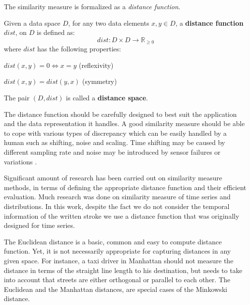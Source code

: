 \iftoggle{edit-mode}{\hspace{0pt}\marginpar{Distance function formal definition}}{}
The similarity measure is formalized as a \emph{distance function}. 
\begin{definition}
Given a data space $D$, for any two data elements $x,y \in D$, a \textbf{distance function} $dist$, on $D$ is defined as:
\begin{equation}
dist: D \times D \longrightarrow \mathbb R_{\geq 0} 
\end{equation}
where $dist$ has the following properties:
\begin{compactitem}
\item $dist(x,y)=0 \Leftrightarrow x=y$ (reflexivity)
\item $dist(x,y) = dist(y,x)$ (symmetry)
\end{compactitem}
The pair $(D,dist)$ is called a \textbf{distance space}.
\label{def:distance_function}
\end{definition}

\iftoggle{edit-mode}{\hspace{0pt}\marginpar{Properties of a good dissimilarity measure.}}{}
The distance function should be carefully designed to best suit the application and the data representation it handles.
A good similarity measure should be able to cope with various types of discrepancy which can be easily handled by a human such as shifting, noise and scaling. Time shifting may be caused by different sampling rate and noise may be introduced by sensor failures or variations \cite{chen2005similarity}.

\iftoggle{edit-mode}{\hspace{0pt}\marginpar{Previous research}}{}
Significant amount of research has been carried out on similarity measure methods, in terms of defining the appropriate distance function and their efficient evaluation. 
Much research was done on similarity measure of time series and distributions. 
In this work, despite the fact we do not consider the temporal information of the written stroke we use a distance function that was originally designed for time series.

\iftoggle{edit-mode}{\hspace{0pt}\marginpar{Euclidean and Manhattan}}{}
The Euclidean distance is a basic, common and easy to compute distance function. 
Yet, it is not necessarily appropriate for capturing distances in any given space. 
For instance, a taxi driver in Manhattan should not measure the distance in terms of the straight line length to his destination, but needs to take into account that streets are either orthogonal or parallel to each other.
The Euclidean and the Manhattan distances, are special cases of the Minkowski distance.

